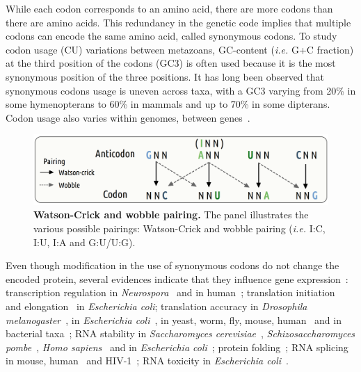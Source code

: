 While each codon corresponds to an amino acid, there are more codons than there are amino acids. This redundancy in the genetic code implies that multiple codons can encode the same amino acid, called \gls{synonymous} codons. To study \gls{codon usage} (\acrshort{CU}) variations between metazoans, \gls{GC-content} (\textit{i.e.} \acrshort{G}+\acrshort{C} fraction) at the third position of the codons (\acrshort{GC3}) is often used because it is the most \gls{synonymous} position of the three positions. It has long been observed that \gls{synonymous} codons usage is uneven across taxa, with a \acrshort{GC3} varying from 20\% in some hymenopterans to 60\% in mammals and up to 70\% in some dipterans. Codon usage also varies within genomes, between genes~\citep{grantham_codon_1980, grantham_codon_1980-1, gouy_codon_1982, ikemura_codon_1985, parvathy_codon_2022}. 

\begin{figure}[ht]
    \centering
    \includegraphics[width=0.8\linewidth]{figures/wobble_pairing.png}
    \caption[Watson-Crick and wobble pairing]{\textbf{Watson-Crick and wobble pairing.} The panel illustrates the various possible pairings: Watson-Crick and wobble pairing (\textit{i.e.} I:C, I:U, I:A and G:U/U:G).\newline}
    \label{fig:pairing}
\end{figure}


Even though modification in the use of \gls{synonymous} codons do not change the encoded protein, several evidences indicate that they influence gene expression~\citep{hershberg_selection_2008, plotkin_synonymous_2011, martinez_synonymous_2019, liu_synonymous_2021}: transcription regulation in \textit{Neurospora}~\citep{zhou_codon_2016, zhao_genome-wide_2021} and in human~\citep{fu_codon_2018}; translation initiation~\citep{eyre-walker_reduced_1993, bhattacharyya_accessibility_2018, goodman_causes_2013} and elongation~\citep{sorensen_codon_1989, boel_codon_2016} in \textit{Escherichia coli}; translation accuracy in \textit{Drosophila melanogaster}~\citep{akashi_synonymous_1994}, in \textit{Escherichia coli}~\citep{stoletzki_synonymous_2007}, in yeast, worm, fly, mouse, human~\citep{drummond_mistranslation-induced_2008} and in bacterial taxa~\citep{sun_preferred_2022}; \acrshort{RNA} stability in \textit{Saccharomyces cerevisiae}~\citep{presnyak_codon_2015}, \textit{Schizosaccharomyces pombe}~\citep{harigaya_analysis_2016}, \textit{Homo sapiens}~\citep{hia_codon_2019} and in \textit{Escherichia coli}~\citep{kudla_coding-sequence_2009}; protein folding~\citep{drummond_mistranslation-induced_2008, buhr_synonymous_2016, walsh_synonymous_2020}; \acrshort{RNA} splicing in mouse, human~\citep{pagani_synonymous_2005} and HIV-1~\citep{takata_global_2018}; \acrshort{RNA} toxicity in \textit{Escherichia coli}~\citep{mittal_codon_2018}.


